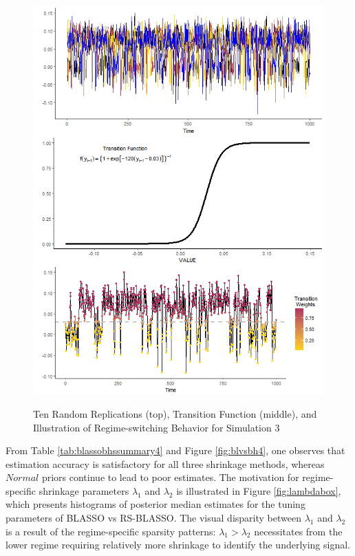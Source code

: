 \begin{figure}[ht!]
	\centering
	\caption{Ten Random Replications (top), Transition Function (middle), and Illustration of Regime-switching Behavior  for Simulation 3}
	\includegraphics[scale=.7]{sim3plots}
	\label{fig:sim3plots}
\end{figure}
From Table \ref{tab:blassobhssummary4} and Figure \ref{fig:blvsbh4}, one observes that estimation accuracy is satisfactory for all three shrinkage methods, whereas $Normal$ priors continue to lead to poor estimates. The motivation for regime-specific shrinkage parameters $\lambda_1$ and $\lambda_2$ is illustrated in Figure \ref{fig:lambdabox}, which presents histograms of posterior median estimates for the tuning parameters of BLASSO vs RS-BLASSO. The visual disparity between $\lambda_1$ and $\lambda_2$ is a result of the regime-specific sparsity patterns: $\lambda_1>\lambda_2$ necessitates from the lower regime requiring relatively more shrinkage to identify the underlying signal.


